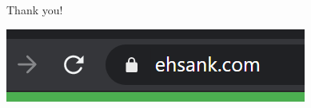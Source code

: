 \documentclass[
  ignorenonframetext,
  aspectratio=169]{beamer}
\begin{document}
\begin{frame}{Thank you!}
\protect\hypertarget{thank-you}{}
\begin{center}
\includegraphics[width=1\linewidth]{site.png} 
\end{center}
\end{frame}
\end{document}
